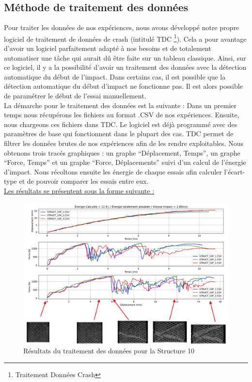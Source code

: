 \documentclass[a4paper]{article}
\begin{document}
	\subsection{Méthode de traitement des données}
	
	\hspace{0.5cm}Pour traiter les données de nos expériences, nous avons développé notre propre logiciel de traitement de données de crash (intitulé TDC \footnote{Traitement Données Crash}). Cela a pour avantage d’avoir un logiciel parfaitement adapté à nos besoins et de totalement automatiser une tâche qui aurait dû être faite sur un tableau classique. Ainsi, sur ce logiciel, il y a la possibilité d’avoir un traitement des données avec la détection automatique du début de l’impact. Dans certains cas, il est possible que la détection automatique du début d'impact ne fonctionne pas. Il est alors possible de paramétrer le début de l'essai manuellement.\\ 
	
	La démarche pour le traitement des données est la suivante : 
	Dans un premier temps nous récupérons les fichiers au format .CSV de nos expériences. Ensuite, nous chargeons ces fichiers dans TDC. Le logiciel est déjà programmé avec des paramètres de base qui fonctionnent dans le plupart des cas. TDC permet de filtrer les données brutes de nos expériences afin de les rendre exploitables. Nous obtenons trois tracés graphiques : un graphe “Déplacement, Temps”, un graphe “Force, Temps” et un graphe “Force, Déplacements” suivi d'un calcul de l'énergie d'impact. Nous récoltons ensuite les énergie de chaque essais afin calculer l'écart-type et de pouvoir comparer les essais entre eux.\\
	
	\underline{Les résultats se présentent sous la forme suivante :}\\
	
	\begin{figure}[H]
		\centering
		\includegraphics[width=16cm]{Images/7/7_1/TDC_STRUCT_10.pdf}
		\caption{Résultats du traitement des données pour la Structure 10}
	\end{figure}
	
\end{document}
